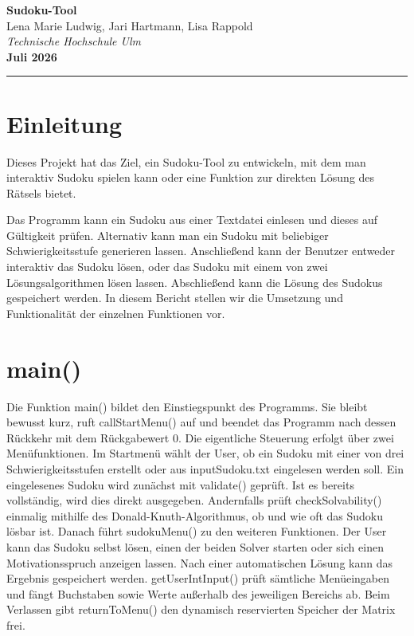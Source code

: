 \documentclass[a4paper,10pt]{article}
\newcommand{\berichtstitel}{Sudoku-Tool}
\newcommand{\autoren}{Lena Marie Ludwig, Jari Hartmann, Lisa Rappold}
\newcommand{\institution}{Technische Hochschule Ulm}
\newcommand{\datum}{Juli 2026}
\begin{document}
\thispagestyle{plain}
\begin{center}
    \LARGE \textbf{\berichtstitel} \\[0.4cm]
    \large \autoren \\[0.2cm]
    \small \textit{\institution} \\[0.3cm]
    \small \textbf{\datum} \\[0.2cm] 
    \rule{\linewidth}{1pt} 
\end{center}
\vspace{0.5cm}


\vspace{0.8cm}

\section*{Einleitung}

Dieses Projekt hat das Ziel, ein Sudoku-Tool zu entwickeln, mit dem man interaktiv Sudoku spielen kann oder eine Funktion zur direkten Lösung des Rätsels bietet. 

Das Programm kann ein Sudoku aus einer Textdatei einlesen und dieses auf Gültigkeit prüfen. Alternativ kann man ein Sudoku mit beliebiger Schwierigkeitsstufe generieren lassen. Anschließend kann der Benutzer entweder interaktiv das Sudoku lösen, oder das Sudoku mit einem von zwei Lösungsalgorithmen lösen lassen. Abschließend kann die Lösung des Sudokus gespeichert werden.
In diesem Bericht stellen wir die Umsetzung und Funktionalität der einzelnen Funktionen vor.

\section{main()}

Die Funktion main() bildet den Einstiegspunkt des Programms. Sie bleibt bewusst kurz, ruft callStartMenu() auf und beendet das Programm nach dessen Rückkehr mit dem Rückgabewert 0. Die eigentliche Steuerung erfolgt über zwei Menüfunktionen. Im Startmenü wählt der User, ob ein Sudoku mit einer von drei Schwierigkeitsstufen erstellt oder aus inputSudoku.txt eingelesen werden soll. Ein eingelesenes Sudoku wird zunächst mit validate() geprüft. Ist es bereits vollständig, wird dies direkt ausgegeben. Andernfalls prüft checkSolvability() einmalig mithilfe des Donald-Knuth-Algorithmus, ob und wie oft das Sudoku lösbar ist.
Danach führt sudokuMenu() zu den weiteren Funktionen. Der User kann das Sudoku selbst lösen, einen der beiden Solver starten oder sich einen Motivationsspruch anzeigen lassen. Nach einer automatischen Lösung kann das Ergebnis gespeichert werden. getUserIntInput() prüft sämtliche Menüeingaben und fängt Buchstaben sowie Werte außerhalb des jeweiligen Bereichs ab. Beim Verlassen gibt returnToMenu() den dynamisch reservierten Speicher der Matrix frei.
\end{document}
